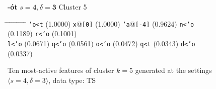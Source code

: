  
\begin{figure}[htb] 
\begin{mdframed}
{\LARGE \textbf{-\'ot}} \hfill {\large$s=\textbf{4}, \delta=\textbf{3}$} \hfill Cluster 5\\
\vspace{-10pt}
\begin{normalsize}
\begin{tabbing}
\hspace{6ex} \= \hspace{11ex} \= \hspace{6ex} \= \hspace{12ex} \= \hspace{8ex} \= \hspace{11ex} \= \hspace{5ex} \= \hspace{12ex} \= \hspace{6ex} \= \hspace{9ex} \kill
\texttt{\a'{o}<t} \> (1.0000) \> \texttt{x}@\texttt{[0]} \> (1.0000) \> \texttt{\a'{a}}@\texttt{[-4]} \> (0.9624) \> \texttt{n<\a'{o}} \> (0.1189) \> \texttt{r<\a'{o}} \> (0.1001) \\
 \texttt{l<\a'{o}} \> (0.0671) \> \texttt{q<\a'{o}} \> (0.0561) \> \texttt{o<\a'{o}} \> (0.0472) \> \texttt{q<t} \> (0.0343) \> \texttt{d<\a'{o}} \> (0.0337)
 \end{tabbing}
 \end{normalsize}
\caption{Ten most-active features of cluster $k = 5$ generated at the settings $\langle{s}=4,\delta=3\rangle$, data type: TS}
\label{fig:cluster-5-4-3-TS}
\end{mdframed}
\end{figure}

